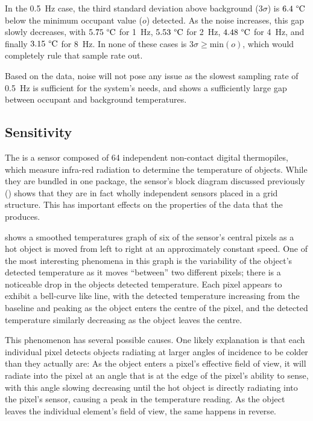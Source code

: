 \documentclass[../thesis/thesis.tex]{subfiles}
\begin{document}
In the 0.5~Hz case, the third standard deviation above background ($3\sigma$) is $6.4~\degree\textrm{C}$ below the minimum occupant value ($o$) detected. As the noise increases, this gap slowly decreases, with $5.75~\degree\textrm{C}$ for 1~Hz, $5.53~\degree\textrm{C}$ for 2~Hz, $4.48~\degree\textrm{C}$ for 4~Hz, and finally $3.15~\degree\textrm{C}$ for 8~Hz. In none of these cases is $3\sigma \ge \mathrm{min}(o)$, which would completely rule that sample rate out.

Based on the data, noise will not pose any issue as the slowest sampling rate of 0.5~Hz is sufficient for the system's needs, and shows a sufficiently large gap between occupant and background temperatures.

\subsection{Sensitivity}
\label{subsec:sensitivity}

The \mlx is a sensor composed of 64 independent non-contact digital thermopiles, which measure infra-red radiation to determine the temperature of objects. While they are bundled in one package, the sensor's block diagram discussed previously () shows that they are in fact wholly independent sensors placed in a grid structure. This has important effects on the properties of the data that the \mlx produces. 

 shows a smoothed temperatures graph of six of the sensor's central pixels as a hot object is moved from left to right at an approximately constant speed. One of the most interesting phenomena in this graph is the variability of the object's detected temperature as it moves ``between'' two different pixels; there is a noticeable drop in the objects detected temperature. Each pixel appears to exhibit a bell-curve like line, with the detected temperature increasing from the baseline and peaking as the object enters the centre of the pixel, and the detected temperature similarly decreasing as the object leaves the centre. 

This phenomenon has several possible causes. One likely explanation is that each individual pixel detects objects radiating at larger angles of incidence to be colder than they actually are: As the object enters a pixel's effective field of view, it will radiate into the pixel at an angle that is at the edge of the pixel's ability to sense, with this angle slowing decreasing until the hot object is directly radiating into the pixel's sensor, causing a peak in the temperature reading. As the object leaves the individual element's field of view, the same happens in reverse.
\end{document}

